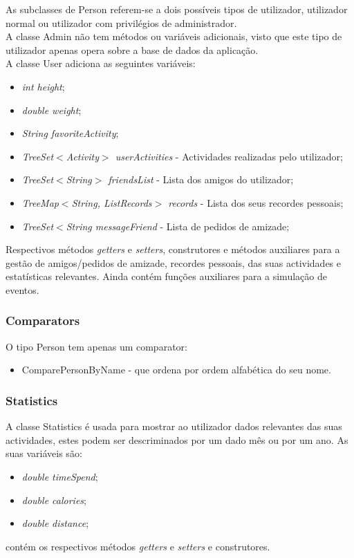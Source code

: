 \documentclass[10pt,notitlepage]{article}
\begin{document}
As subclasses de Person referem-se a dois possíveis tipos de utilizador, utilizador normal ou utilizador com privilégios de administrador.\\
A classe Admin não tem métodos ou variáveis adicionais, visto que este tipo de utilizador apenas opera sobre a base de dados da aplicação.\\
A classe User adiciona as seguintes variáveis:
\begin{itemize}
\item \textit{int height};
\item \textit{double weight};
\item \textit{String favoriteActivity};
\item \textit{TreeSet$<$Activity$>$ userActivities} - Actividades realizadas pelo utilizador;
\item \textit{TreeSet$<$String$>$ friendsList} - Lista dos amigos do utilizador;
\item \textit{TreeMap$<$String, ListRecords$>$ records} - Lista dos seus recordes pessoais;
\item \textit{TreeSet$<$String messageFriend} - Lista de pedidos de amizade;
\end{itemize}
Respectivos métodos \textit{getters} e \textit{setters}, construtores e métodos auxiliares para a gestão de amigos/pedidos de amizade, recordes pessoais, das suas actividades e estatísticas relevantes. Ainda contém funções auxiliares para a simulação de eventos.

\subsubsection{Comparators}
O tipo Person tem apenas um comparator:
\begin{itemize}
\item ComparePersonByName - que ordena por ordem alfabética do seu nome.
\end{itemize}
\subsubsection{Statistics}

A classe Statistics é usada para mostrar ao utilizador dados relevantes das suas actividades, estes podem ser descriminados por um dado mês ou por um ano. As suas variáveis são:
\begin{itemize}
\item \textit{double timeSpend};
\item \textit{double calories};
\item \textit{double distance};
\end{itemize}
contém os respectivos métodos \textit{getters} e \textit{setters} e construtores.
\end{document}
